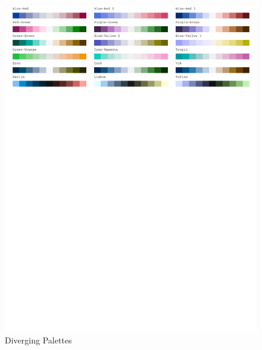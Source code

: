 \begin{figure}[H]
\centering
\includegraphics[width = \textwidth, trim= 0 8in 0 0, clip]{graphics/appFigs/hcl_pals_div.pdf}
\caption{Diverging Palettes}
\end{figure}

\vspace{2em}


